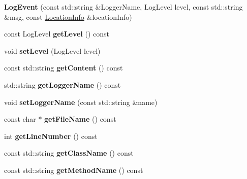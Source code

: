 \begin{DoxyCompactItemize}
\item 
\mbox{\label{classLogEvent_a181e5d602eb9df5e20f360c7af9b27d2}} 
{\bfseries Log\+Event} (const std\+::string \&Logger\+Name, Log\+Level level, const std\+::string \&msg, const \hyperlink{classLocationInfo}{Location\+Info} \&location\+Info)
\item 
\mbox{\label{classLogEvent_a9bd0ae550628dd89613a43096a4024f6}} 
const Log\+Level {\bfseries get\+Level} () const
\item 
\mbox{\label{classLogEvent_ab6ebc10c5364024cb62e4efd4084c1eb}} 
void {\bfseries set\+Level} (Log\+Level level)
\item 
\mbox{\label{classLogEvent_af627f2f0db5be1ec33c01e8cd6daa5d8}} 
const std\+::string {\bfseries get\+Content} () const
\item 
\mbox{\label{classLogEvent_afa2d56ea2d135527d11a298c2302e3c1}} 
std\+::string {\bfseries get\+Logger\+Name} () const
\item 
\mbox{\label{classLogEvent_a650fd712ced54ee1059a1d403f9cd867}} 
void {\bfseries set\+Logger\+Name} (const std\+::string \&name)
\item 
\mbox{\label{classLogEvent_a9d65087add5c181e43e83ab40aeae1b7}} 
const char $\ast$ {\bfseries get\+File\+Name} () const
\item 
\mbox{\label{classLogEvent_a31c76defd5615f3ccccacbdd30fff722}} 
int {\bfseries get\+Line\+Number} () const
\item 
\mbox{\label{classLogEvent_a28eeeeea9b9c90aea183f4ac1f067928}} 
const std\+::string {\bfseries get\+Class\+Name} () const
\item 
\mbox{\label{classLogEvent_a518024ee4aee4191ba33cfcf41e41617}} 
const std\+::string {\bfseries get\+Method\+Name} () const
\end{DoxyCompactItemize}
